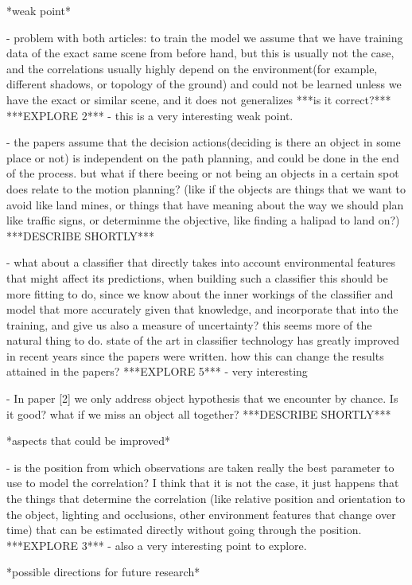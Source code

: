 \documentclass{article}
\begin{document}
	*weak point*
	
	- problem with both articles: to train the model we assume that we have training data of the exact same scene from before hand, but this is usually not the case, and the correlations usually highly depend on the environment(for example, different shadows, or topology of the ground) and could not be learned unless we have the exact or similar scene, and it does not generalizes ***is it correct?***
	***EXPLORE 2*** - this is a very interesting weak point.
	
	- the papers assume that the decision actions(deciding is there an object in some place or not) is independent on the path planning, and could be done in the end of the process. but what if there beeing or not being an objects in a certain spot does relate to the motion planning? (like if the objects are things that we want to avoid like land mines, or things that have meaning about the way we should plan like traffic signs, or determinme the objective, like finding a halipad to land on?) 
	***DESCRIBE SHORTLY***
	
	- what about a classifier that directly takes into account environmental features that might affect its predictions, when building such a classifier this should be more fitting to do, since we know about the inner workings of the classifier and model that more accurately given that knowledge, and incorporate that into the training, and give us also a measure of uncertainty? this seems more of the natural thing to do. state of the art in classifier technology has greatly improved in recent years since the papers were written. how this can change the results attained in the papers?
	***EXPLORE 5*** - very interesting
	
	- In paper [2] we only address object hypothesis that we encounter by chance. Is it good? what if we miss an object all together?
	***DESCRIBE SHORTLY***
	
	*aspects that could be improved*
	
	- is the position from which observations are taken really the best parameter to use to model the correlation? I think that it is not the case, it just happens that the things that determine the correlation (like relative position and orientation to the object, lighting and occlusions, other environment features that change over time) that can be estimated directly without going through the position.
	***EXPLORE 3*** - also a very interesting point to explore.	
		
	*possible directions for future research*
	
\end{document}

